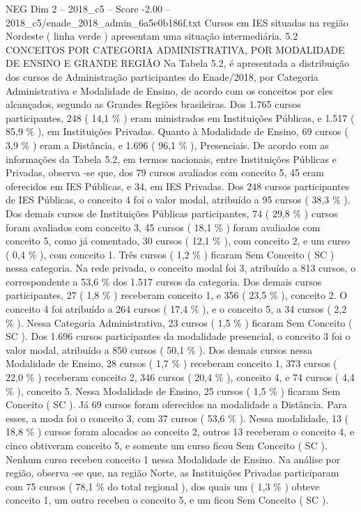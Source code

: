 \begin{textsample}{NEG Dim 2 – 2018\_c5 – Score -2.00 – 2018\_c5/enade\_2018\_admin\_6a5e0b186f.txt}
Cursos em IES situadas na região Nordeste ( linha verde ) apresentam uma situação intermediária. 5.2 CONCEITOS POR CATEGORIA ADMINISTRATIVA, POR MODALIDADE DE ENSINO E GRANDE REGIÃO Na Tabela 5.2, é apresentada a distribuição dos cursos de Administração participantes do Enade/2018, por Categoria Administrativa e Modalidade de Ensino, de acordo com os conceitos por eles alcançados, segundo as Grandes Regiões brasileiras.
Dos 1.765 cursos participantes, 248 ( 14,1 \% ) eram ministrados em Instituições Públicas, e 1.517 ( 85,9 \% ), em Instituições Privadas.
Quanto à Modalidade de Ensino, 69 cursos ( 3,9 \% ) eram a Distância, e 1.696 ( 96,1 \% ), Presenciais.
De acordo com as informações da Tabela 5.2, em termos nacionais, entre Instituições Públicas e Privadas, observa -se que, dos 79 cursos avaliados com conceito 5, 45 eram oferecidos em IES Públicas, e 34, em IES Privadas.
Dos 248 cursos participantes de IES Públicas, o conceito 4 foi o valor modal, atribuído a 95 cursos ( 38,3 \% ).
Dos demais cursos de Instituições Públicas participantes, 74 ( 29,8 \% ) cursos foram avaliados com conceito 3, 45 cursos ( 18,1 \% ) foram avaliados com conceito 5, como já comentado, 30 cursos ( 12,1 \% ), com conceito 2, e um curso ( 0,4 \% ), com conceito 1.
Três cursos ( 1,2 \% ) ficaram Sem Conceito ( SC ) nessa categoria.
Na rede privada, o conceito modal foi 3, atribuído a 813 cursos, o correspondente a 53,6 \% dos 1.517 cursos da categoria.
Dos demais cursos participantes, 27 ( 1,8 \% ) receberam conceito 1, e 356 ( 23,5 \% ), conceito 2.
O conceito 4 foi atribuído a 264 cursos ( 17,4 \% ), e o conceito 5, a 34 cursos ( 2,2 \% ).
Nessa Categoria Administrativa, 23 cursos ( 1,5 \% ) ficaram Sem Conceito ( SC ).
Dos 1.696 cursos participantes da modalidade presencial, o conceito 3 foi o valor modal, atribuído a 850 cursos ( 50,1 \% ).
Dos demais cursos nessa Modalidade de Ensino, 28 cursos ( 1,7 \% ) receberam conceito 1, 373 cursos ( 22,0 \% ) receberam conceito 2, 346 cursos ( 20,4 \% ), conceito 4, e 74 cursos ( 4,4 \% ), conceito 5.
Nessa Modalidade de Ensino, 25 cursos ( 1,5 \% ) ficaram Sem Conceito ( SC ).
Já 69 cursos foram oferecidos na modalidade a Distância.
Para esses, a moda foi o conceito 3, com 37 cursos ( 53,6 \% ).
Nessa modalidade, 13 ( 18,8 \% ) cursos foram alocados ao conceito 2, outros 13 receberam o conceito 4, e cinco obtiveram conceito 5, e somente um curso ficou Sem Conceito ( SC ).
Nenhum curso recebeu conceito 1 nessa Modalidade de Ensino.
Na análise por região, observa -se que, na região Norte, as Instituições Privadas participaram com 75 cursos ( 78,1 \% do total regional ), dos quais um ( 1,3 \% ) obteve conceito 1, um outro recebeu o conceito 5, e um ficou Sem Conceito ( SC ).

\end{textsample}

